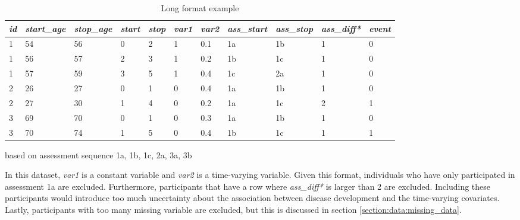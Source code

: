 \begin{table} [H]
    \centering
    \caption{Long format example}
    \begin{tabular}{|l|l|l|l|l|l|l|l|l|l|l|}
\hline
\textit{id} & \textit{start\_age} & \textit{stop\_age} & \textit{start} & \textit{stop} & \textit{var1} & \textit{var2} & \textit{ass\_start} & \textit{ass\_stop} & \textit{ass\_diff*} & \textit{event} \\ \hline
1  & 54         & 56        & 0     & 2    & 1    & 0.1  & 1a                & 1b               & 1                & 0     \\ \hline
1  & 56         & 57        & 2     & 3    & 1    & 0.2  & 1b                & 1c               & 1                & 0     \\ \hline
1  & 57         & 59        & 3     & 5    & 1    & 0.4  & 1c                & 2a               & 1                & 0     \\ \hline
2  & 26         & 27        & 0     & 1    & 0    & 0.4  & 1a                & 1b               & 1                & 0     \\ \hline
2  & 27         & 30        & 1     & 4    & 0    & 0.2  & 1a                & 1c               & 2                & 1     \\ \hline
3  & 69         & 70        & 0     & 1    & 0    & 0.3  & 1a                & 1b               & 1                & 0     \\ \hline
3  & 70         & 74        & 1     & 5    & 0    & 0.4  & 1b                & 1c               & 1                & 1     \\ \hline
    \end{tabular}
    \begin{tablenotes}
        \small
        \item* based on assessment sequence 1a, 1b, 1c, 2a, 3a, 3b
      \end{tablenotes}
    \label{table:data:example_long_format}
\end{table}

In this dataset, \textit{var1} is a constant variable and \textit{var2} is a time-varying variable. Given this format, individuals who have only participated in assessment 1a are excluded. Furthermore, participants that have a row where \textit{ass\_diff*} is larger than 2 are excluded. Including these participants would introduce too much uncertainty about the association between disease development and the time-varying covariates. Lastly, participants with too many missing variable are excluded, but this is discussed in section \ref{section:data:missing_data}.


